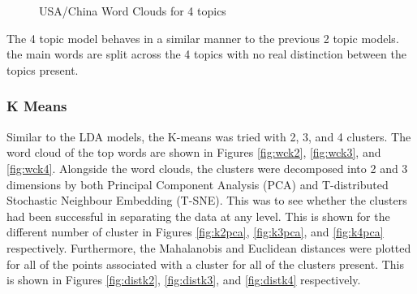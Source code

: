 \begin{figure}[H]
	\centering
	\\
	\\
	
	\caption{USA/China Word Clouds for 4 topics}
	\label{fig:usa4}
\end{figure}

The 4 topic model behaves in a similar manner to the previous 2 topic models. the main words are split across the 4 topics with no real distinction between the topics present. 

\subsubsection{K Means}
Similar to the LDA models, the K-means was tried with 2, 3, and 4 clusters. The word cloud of the top words are shown in Figures \ref{fig:wck2}, \ref{fig:wck3}, and \ref{fig:wck4}. Alongside the word clouds, the clusters were decomposed into 2 and 3 dimensions by both Principal Component Analysis (PCA) and T-distributed Stochastic Neighbour Embedding (T-SNE). This was to see whether the clusters had been successful in separating the data at any level. This is shown for the different number of cluster in Figures \ref{fig:k2pca}, \ref{fig:k3pca}, and \ref{fig:k4pca} respectively. Furthermore, the Mahalanobis and Euclidean distances were plotted for all of the points associated with a cluster for all of the clusters present. This is shown in Figures \ref{fig:distk2}, \ref{fig:distk3}, and \ref{fig:distk4} respectively. 

